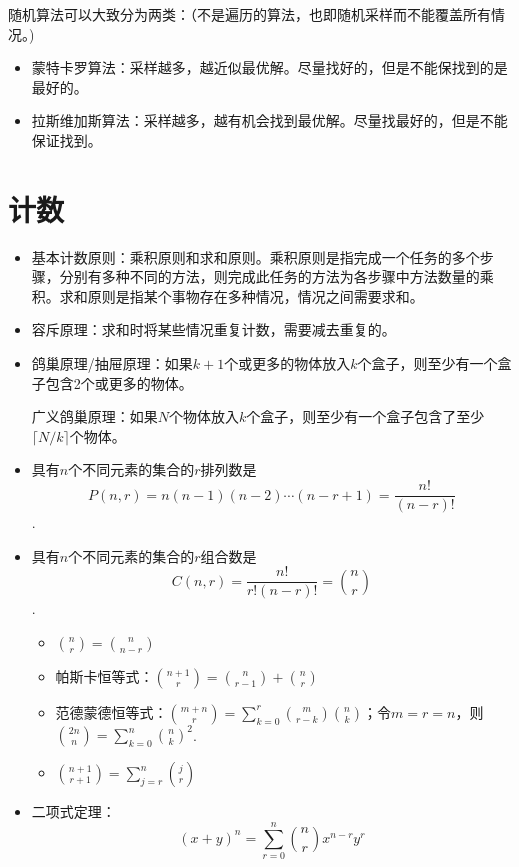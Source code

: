 随机算法可以大致分为两类：（不是遍历的算法，也即随机采样而不能覆盖所有情况。)
\begin{itemize}
    \item 蒙特卡罗算法：采样越多，越近似最优解。尽量找好的，但是不能保找到的是最好的。
    \item 拉斯维加斯算法：采样越多，越有机会找到最优解。尽量找最好的，但是不能保证找到。
\end{itemize}

\section{计数}
\begin{itemize}
    \item 基本计数原则：乘积原则和求和原则。乘积原则是指完成一个任务的多个步骤，分别有多种不同的方法，则完成此任务的方法为各步骤中方法数量的乘积。求和原则是指某个事物存在多种情况，情况之间需要求和。

    \item 容斥原理：求和时将某些情况重复计数，需要减去重复的。

    \item 鸽巢原理/抽屉原理：如果$k+1$个或更多的物体放入$k$个盒子，则至少有一个盒子包含2个或更多的物体。

    广义鸽巢原理：如果$N$个物体放入$k$个盒子，则至少有一个盒子包含了至少$\lceil N/k \rceil$个物体。

    \item 具有$n$个不同元素的集合的$r$排列数是\[P(n,r) = n(n-1)(n-2) \cdots (n-r+1) = \frac {n!}{(n-r)!}\].
    
    \item 具有$n$个不同元素的集合的$r$组合数是\[C(n,r) = \frac {n!}{r!(n-r)!} = \binom{n}{r}\].

    \begin{itemize}
        \item $\displaystyle \binom{n}{r} = \binom{n}{n-r}$
        \item 帕斯卡恒等式：$\displaystyle \binom{n+1}{r} = \binom{n}{r-1} + \binom{n}{r}$
        \item 范德蒙德恒等式：$\displaystyle \binom{m+n}{r} = \sum_{k=0}^r \binom{m}{r-k} \binom{n}{k}$；令$m = r = n$，则$\displaystyle \binom{2n}{n} = \sum_{k=0}^n \binom{n}{k}^2$.
        \item $\displaystyle \binom{n+1}{r+1} = \sum_{j=r}^n \binom{j}{r}$
    \end{itemize}

    \item 二项式定理：\[(x+y)^n = \sum_{r = 0}^{n} \binom{n}{r} x^{n-r} y^r\]


\end{itemize}
